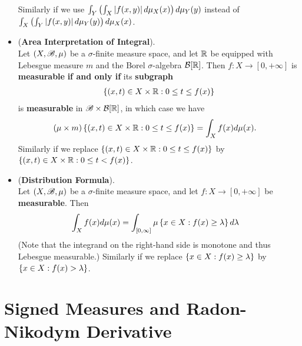 \documentclass[11pt]{article}
\begin{document}
\begin{itemize}
\begin{corollary}
Similarly if we use $ \int_Y\left(\int_X \left\lvert f(x, y) \right\rvert d\mu_X(x) \right)d\mu_Y(y)$ instead of $ \int_X\left(\int_Y \left\lvert f(x, y) \right\rvert d\mu_Y(y)\right) d\mu_X(x) $.
\end{corollary}

\item \begin{proposition} (\textbf{Area Interpretation of Integral}).  \citep{tao2011introduction}\\
Let $(X, {\mathscr B}, \mu)$ be a $\sigma$-finite measure space, and let ${\mathbb R}$ be equipped with Lebesgue measure $m$ and the Borel $\sigma$-algebra ${\mathcal B}[{\mathbb R}]$. Then $f : X \to [0, +\infty]$ is \textbf{measurable} \textbf{if and only if} its \textbf{subgraph}
\begin{align*}
\left\{(x, t)\in X \times {\mathbb R}: 0 \le t\le f(x)\right\}
\end{align*} is \textbf{measurable} in ${\mathscr B} \times {\mathcal B}[{\mathbb R}]$, in which case we have
\begin{align*}
\left(\mu \times m\right)\left\{(x, t)\in X \times {\mathbb R}: 0 \le t\le f(x)\right\} &= \int_{X} f(x) d\mu(x).
\end{align*} Similarly if we replace $\left\{(x, t)\in X \times {\mathbb R}: 0 \le t\le f(x)\right\}$ by $\left\{(x, t)\in X \times {\mathbb R}: 0 \le t < f(x)\right\}$.
\end{proposition}

\item \begin{proposition} (\textbf{Distribution Formula}).  \citep{tao2011introduction}\\
Let $(X, {\mathscr B}, \mu)$ be a $\sigma$-finite measure space, and let $f : X \to [0, +\infty]$ be \textbf{measurable}. Then
\begin{align}
 \int_{X} f(x) d\mu(x) &= \int_{[0, \infty]}\mu\left\{x\in X: f(x) \ge \lambda\right\} d\lambda \label{eqn: distribution_formula}
\end{align}
(Note that the integrand on the right-hand side is monotone and thus Lebesgue measurable.) Similarly if we replace $\left\{x\in X: f(x) \ge \lambda\right\}$ by $\left\{x\in X: f(x) > \lambda\right\}$.
\end{proposition}
\end{itemize}

\section{Signed Measures and Radon-Nikodym Derivative}
\end{document}
